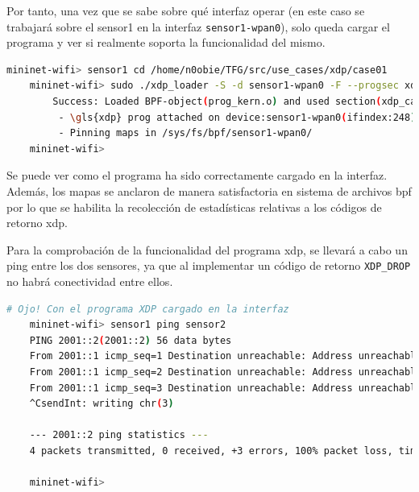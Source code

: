 \vspace{0.5cm}

 Por tanto, una vez que se sabe sobre qué interfaz operar (en este caso se trabajará sobre el sensor1 en la interfaz \texttt{sensor1-wpan0}), solo queda cargar el programa y ver si realmente soporta la funcionalidad del mismo.

\begin{lstlisting}[language= bash, style=Consola, caption={Carga de programa XDP en interfaz ieee802154},label=code:futureW_load6]
    mininet-wifi> sensor1 cd /home/n0obie/TFG/src/use_cases/xdp/case01
    mininet-wifi> sudo ./xdp_loader -S -d sensor1-wpan0 -F --progsec xdp_case01
        Success: Loaded BPF-object(prog_kern.o) and used section(xdp_case01)
         - \gls{xdp} prog attached on device:sensor1-wpan0(ifindex:248)
         - Pinning maps in /sys/fs/bpf/sensor1-wpan0/
    mininet-wifi>
\end{lstlisting}
\vspace{0.5cm}
Se puede ver como el programa ha sido correctamente cargado en la interfaz. Además, los mapas se anclaron de manera satisfactoria en sistema de archivos \gls{bpf} por lo que se habilita la recolección de estadísticas relativas a los códigos de retorno \gls{xdp}. \\
\par
Para la comprobación de la funcionalidad del programa \gls{xdp}, se llevará a cabo un ping entre los dos sensores, ya que al implementar un código de retorno \texttt{XDP\_DROP} no habrá conectividad entre ellos.
\begin{lstlisting}[language= bash, style=Consola, caption={Comprobación funcionamiento programa XDP en interfaz ieee802154},label=code:futureW_func6]
    # Ojo! Con el programa XDP cargado en la interfaz
    mininet-wifi> sensor1 ping sensor2
    PING 2001::2(2001::2) 56 data bytes
    From 2001::1 icmp_seq=1 Destination unreachable: Address unreachable
    From 2001::1 icmp_seq=2 Destination unreachable: Address unreachable
    From 2001::1 icmp_seq=3 Destination unreachable: Address unreachable
    ^CsendInt: writing chr(3)
    
    --- 2001::2 ping statistics ---
    4 packets transmitted, 0 received, +3 errors, 100% packet loss, time 3072ms
    
    mininet-wifi>

\end{lstlisting}

